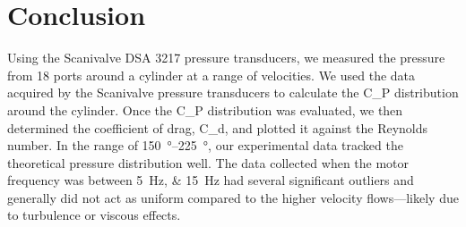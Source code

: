 \chapter{Conclusion}
\label{cp:conclusion}

Using the Scanivalve DSA 3217 pressure transducers, we measured the pressure from \num{18} ports around a cylinder at a range of velocities. We used the data acquired by the Scanivalve pressure transducers to calculate the \gls{C_P} distribution around the cylinder. Once the \gls{C_P} distribution was evaluated, we then determined the coefficient of drag, \gls{C_d}, and plotted it against the Reynolds number. In the range of \qtyrange{150}{225}{\degree}, our experimental data tracked the theoretical pressure distribution well. The data collected when the motor frequency was between \qtylist{5;15}{\hertz} had several significant outliers and generally did not act as uniform compared to the higher velocity flows—likely due to turbulence or viscous effects.